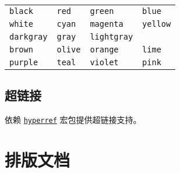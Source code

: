 \begin{table}[h]
	\centering
	\begin{tabular}{l l l l}
		\hline
		\fcolorbox{black}{black}{ }    \verb|black|    & \fcolorbox{black}{red}{ }   \verb|red|   & \fcolorbox{black}{green}{ }     \verb|green|     & \fcolorbox{black}{blue}{ }   \verb|blue|   \\
		\fcolorbox{black}{white}{ }    \verb|white|    & \fcolorbox{black}{cyan}{ }  \verb|cyan|  & \fcolorbox{black}{magenta}{ }   \verb|magenta|   & \fcolorbox{black}{yellow}{ } \verb|yellow| \\
		\hline
		\fcolorbox{black}{darkgray}{ } \verb|darkgray| & \fcolorbox{black}{gray}{ }  \verb|gray|  & \fcolorbox{black}{lightgray}{ } \verb|lightgray| &                                            \\
		\fcolorbox{black}{brown}{ }    \verb|brown|    & \fcolorbox{black}{olive}{ } \verb|olive| & \fcolorbox{black}{orange}{ }    \verb|orange|    & \fcolorbox{black}{lime}{ }   \verb|lime|   \\
		\fcolorbox{black}{purple}{ }   \verb|purple|   & \fcolorbox{black}{teal}{ }  \verb|teal|  & \fcolorbox{black}{violet}{ }    \verb|violet|    & \fcolorbox{black}{pink}{ }   \verb|pink|   \\
		\hline
	\end{tabular}
\end{table}
%

\subsection{超链接}
%
依赖 \href{https://ctan.org/pkg/hyperref}{\texttt{hyperref}} 宏包提供超链接支持。
%

\newpage
\section{排版文档}

